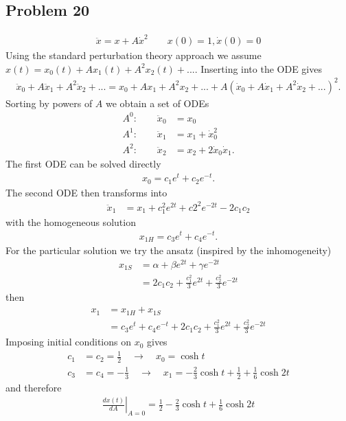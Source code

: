 \documentclass[../main.tex]{subfiles}
\begin{document}
\subsection{Problem 20}
\begin{align}
    \ddot{x}=x+A\dot{x}^2\quad\quad x(0)=1, \dot{x}(0)=0
\end{align}
Using the standard perturbation theory approach we assume $x(t)=x_0(t)+Ax_1(t)+A^2x_2(t)+...$. Inserting into the ODE gives 
\begin{align}
    \ddot{x}_0+A\ddot{x}_1+A^2\ddot{x}_2+...=x_0+Ax_1+A^2x_2+...+A\left(\dot{x}_0+A\dot{x}_1+A^2\dot{x}_2+...\right)^2.
\end{align}
Sorting by powers of $A$ we obtain a set of ODEs
\begin{align}
    A^0:\quad\quad\ddot{x}_0&=x_0\\
    A^1:\quad\quad\ddot{x}_1&=x_1+\dot{x}_0^2\\
    A^2:\quad\quad\ddot{x}_2&=x_2+2\dot{x}_0\dot{x}_1.
\end{align}
The first ODE can be solved directly
\begin{align}
    x_0=c_1e^t+c_2e^{-t}.
\end{align}
The second ODE then transforms into
\begin{align}
    \ddot{x}_1&=x_1+c_1^2e^{2t}+c2^2e^{-2t}-2c_1c_2
\end{align}
with the homogeneous solution
\begin{align}
    x_{1H}=c_3e^t+c_4e^{-t}.
\end{align}
For the particular solution we try the ansatz (inspired by the inhomogeneity) 
\begin{align}
    x_{1S}&=\alpha+\beta e^{2t}+\gamma e^{-2t}\\
    &=2c_1c_2+\frac{c_1^2}{3}e^{2t}+\frac{c_2^2}{3}e^{-2t}
\end{align}
then
\begin{align}
x_1&=x_{1H}+x_{1S}\\
&=c_3e^t+c_4e^{-t}+2c_1c_2+\frac{c_1^2}{3}e^{2t}+\frac{c_2^2}{3}e^{-2t}
\end{align}
Imposing initial conditions on $x_0$ gives
\begin{align}
    c_1&=c_2=\frac{1}{2}\quad\rightarrow\quad x_0=\cosh t\\
    c_3&=c_4=-\frac{1}{3}\quad\rightarrow\quad x_1=-\frac{2}{3}\cosh t+\frac{1}{2}+\frac{1}{6}\cosh 2t
\end{align}
and therefore
\begin{align}
    \left.\frac{dx(t)}{dA}\right|_{A=0}=\frac{1}{2}-\frac{2}{3}\cosh t+\frac{1}{6}\cosh 2t
\end{align}
\end{document}
